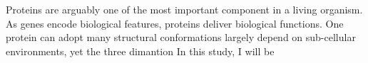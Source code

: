 Proteins are arguably one of the most important component in a living organism. As genes encode biological features, proteins deliver biological functions. One protein can adopt many structural conformations largely depend on sub-cellular environments, yet the three dimantion      In this study, I will be 